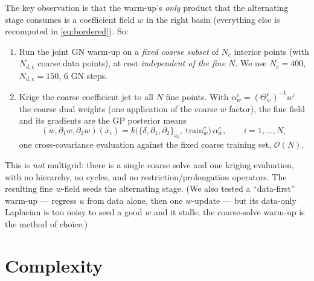 \documentclass[11pt]{article}
\newcommand{\inv}{^{-1}}
\newcommand{\Th}{\Theta}
\newcommand{\bigO}{\mathcal{O}}
\begin{document}
The key observation is that the warm-up's \emph{only} product that the
alternating stage consumes is a coefficient field $w$ in the right basin
(everything else is recomputed in \eqref{eq:bordered}). So:
\begin{enumerate}[leftmargin=2em]
\item Run the joint GN warm-up on a \emph{fixed coarse subset} of $N_c$
  interior points (with $N_{d,c}$ coarse data points), at cost \emph{independent
  of the fine $N$}. We use $N_c=400$, $N_{d,c}=150$, $6$ GN steps.
\item Krige the coarse coefficient jet to all $N$ fine points. With $\alpha_w^c=
  (\Th_w^c)\inv w^c$ the coarse dual weights (one application of the coarse $w$
  factor), the fine field and its gradients are the GP posterior means
  \begin{equation}
  (w,\partial_1 w,\partial_2 w)(x_i)
   = k\bigl(\{\delta,\partial_1,\partial_2\}_{x_i},\ \text{train}_w^c\bigr)\,\alpha_w^c,
   \qquad i=1,\dots,N,
  \end{equation}
  one cross-covariance evaluation against the fixed coarse training set,
  $\bigO(N)$.
\end{enumerate}
This is \emph{not} multigrid: there is a single coarse solve and one kriging
evaluation, with no hierarchy, no cycles, and no restriction/prolongation
operators. The resulting fine $w$-field seeds the alternating stage. (We also
tested a ``data-first'' warm-up --- regress $u$ from data alone, then one
$w$-update --- but its data-only Laplacian is too noisy to seed a good $w$ and
it stalls; the coarse-solve warm-up is the method of choice.)

\section{Complexity}\label{sec:complexity}
\end{document}
